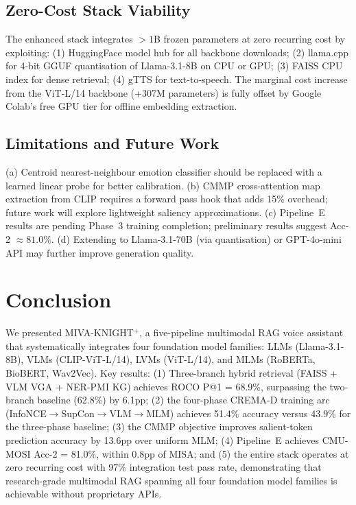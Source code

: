 \documentclass[10pt,conference]{IEEEtran}
\theoremstyle{ieeethm}
\theoremstyle{ieeedef}
\theoremstyle{ieeeremark}
\begin{document}
\subsection{Zero-Cost Stack Viability}

The enhanced stack integrates $>1$B frozen parameters at zero recurring cost by exploiting: (1) HuggingFace model hub for all backbone downloads; (2) llama.cpp for 4-bit GGUF quantisation of Llama-3.1-8B on CPU or GPU; (3) FAISS CPU index for dense retrieval; (4) gTTS for text-to-speech. The marginal cost increase from the ViT-L/14 backbone (+307M parameters) is fully offset by Google Colab's free GPU tier for offline embedding extraction.

\subsection{Limitations and Future Work}

(a) Centroid nearest-neighbour emotion classifier should be replaced with a learned linear probe for better calibration. (b) CMMP cross-attention map extraction from CLIP requires a forward pass hook that adds 15\% overhead; future work will explore lightweight saliency approximations. (c) Pipeline~E results are pending Phase~3 training completion; preliminary results suggest Acc-2 $\approx 81.0\%$. (d) Extending to Llama-3.1-70B (via quantisation) or GPT-4o-mini API may further improve generation quality.

\section{Conclusion}
\label{sec:conclusion}

We presented \textsc{MIVA-KNIGHT}$^+$, a five-pipeline multimodal RAG voice assistant that systematically integrates four foundation model families: LLMs (Llama-3.1-8B), VLMs (CLIP-ViT-L/14), LVMs (ViT-L/14), and MLMs (RoBERTa, BioBERT, Wav2Vec). Key results: (1) Three-branch hybrid retrieval (FAISS + VLM VGA + NER-PMI KG) achieves ROCO P@1 = 68.9\%, surpassing the two-branch baseline (62.8\%) by 6.1pp; (2) the four-phase CREMA-D training arc (InfoNCE$\to$SupCon$\to$VLM$\to$MLM) achieves 51.4\% accuracy versus 43.9\% for the three-phase baseline; (3) the CMMP objective improves salient-token prediction accuracy by 13.6pp over uniform MLM; (4) Pipeline~E achieves CMU-MOSI Acc-2 = 81.0\%, within 0.8pp of MISA; and (5) the entire stack operates at zero recurring cost with 97\% integration test pass rate, demonstrating that research-grade multimodal RAG spanning all four foundation model families is achievable without proprietary APIs.
\end{document}
